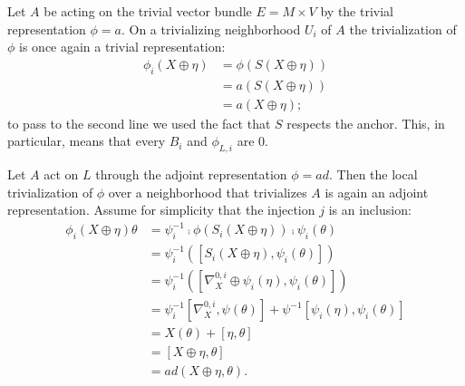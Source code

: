 \begin{example}\label{exampleTrivializationOfTrivialRepresentationIsTrivialRepresentation}
Let $A$ be acting on the trivial vector bundle $E = M \times V$ by the trivial representation $\phi = a$. On a trivializing neighborhood $U_i$ of $A$ the trivialization of $\phi$ is once again a trivial representation:
\begin{align*}
    \phi_i(X \oplus \eta) &= \phi(S(X \oplus \eta))\\
        &= a(S(X \oplus \eta))\\
        &= a(X \oplus \eta);
\end{align*}
to pass to the second line we used the fact that $S$ respects the anchor. This, in particular, means that every $B_i$ and $\phi_{L, i}$ are $0$.
\end{example}

\begin{example}\label{exampleTrivializationOfAdjointRepresentationIsAdjoint}
Let $A$ act on $L$ through the adjoint representation $\phi = ad$. Then the local trivialization of $\phi$ over a neighborhood that trivializes $A$ is again an adjoint representation. Assume for simplicity that the injection $j$ is an inclusion:
\begin{align*}
    \phi_i(X \oplus \eta)\theta &= \psi_i^{-1} \comp \phi(S_i(X \oplus \eta)) \comp \psi_i(\theta)\\
       &= \psi_i^{-1} ( [S_i(X \oplus \eta), \psi_i(\theta)] )\\
       &= \psi_i^{-1} ( [\nabla^{0,i}_X \oplus \psi_i(\eta), \psi_i(\theta)] )\\
       &= \psi_i^{-1}[\nabla^{0, i}_X, \psi(\theta)] + \psi^{-1}[\psi_i(\eta), \psi_i(\theta)]\\
       &= X(\theta) + [\eta, \theta]\\
       &= [X \oplus \eta, \theta]\\
       &= ad(X \oplus \eta, \theta).
\end{align*}
\end{example}

